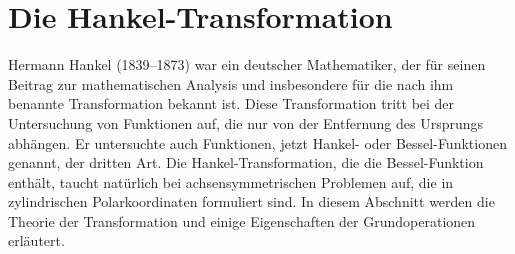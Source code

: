 %
%

\section{Die Hankel-Transformation \label{kreismembran:section:teil2}}
%
%
%
Hermann Hankel (1839--1873) war ein deutscher Mathematiker, der für
seinen Beitrag zur mathematischen Analysis und insbesondere für die
nach ihm benannte Transformation bekannt ist.
Diese Transformation tritt bei der Untersuchung von Funktionen auf,
die nur von der Entfernung des Ursprungs abhängen.
Er untersuchte auch Funktionen, jetzt Hankel- oder Bessel-Funktionen
genannt, der dritten Art.
Die Hankel-Transformation, die die Bessel-Funktion enthält, taucht
natürlich bei achsensymmetrischen Problemen auf, die in zylindrischen
Polarkoordinaten formuliert sind.
In diesem Abschnitt werden die Theorie der Transformation und einige Eigenschaften der Grundoperationen erläutert.

